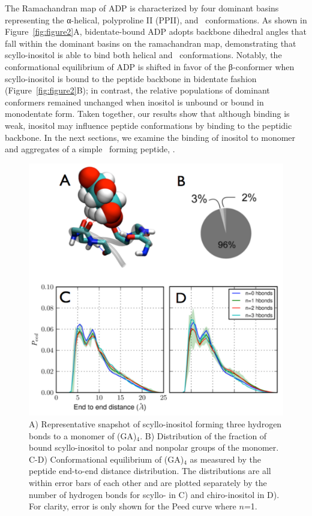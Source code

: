 The Ramachandran map of ADP is characterized by four dominant basins representing the α-helical, polyproline II (PPII), and \bsheet\ conformations.\cite{Neale:2008p87} As shown in Figure~\ref{fig:figure2}A, bidentate-bound ADP adopts backbone dihedral angles that fall within the dominant basins on the ramachandran map, demonstrating that scyllo-inositol is able to bind both helical and \bsheet\ conformations. Notably, the conformational equilibrium of ADP is shifted in favor of the β-conformer when scyllo-inositol is bound to the peptide backbone in bidentate fashion (Figure~\ref{fig:figure2}B); in contrast, the relative populations of dominant conformers remained unchanged when inositol is unbound or bound in monodentate form. Taken together, our results show that although binding is weak, inositol may influence peptide conformations by binding to the peptidic backbone. In the next sections, we examine the binding of inositol to monomer and aggregates of a simple \bsheet\ forming peptide, \gafour.

\begin{figure}[htbp]
  \centering
  \includegraphics[width=5in]{figures/results1/GA4_paper_figures_submitted-3-rearranged}
  \caption[Binding of scyllo-inositol to the monomer of (GA)$_4$.]{A) Representative snapshot of scyllo-inositol forming three hydrogen bonds to a monomer of (GA)$_4$. B) Distribution of the fraction of bound scyllo-inositol to polar and nonpolar groups of the monomer. C-D) Conformational equilibrium of (GA)$_4$ as measured by the peptide end-to-end distance distribution. The distributions are all within error bars of each other and are plotted separately by the number of hydrogen bonds for scyllo- in C) and chiro-inositol in D). For clarity, error is only shown for the Peed curve where $n$=1.}
   \label{fig:figure3}
\end{figure}

